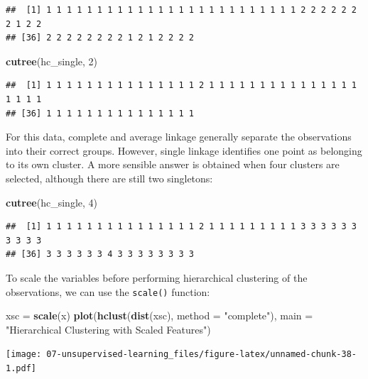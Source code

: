 \documentclass[openany]{book}
\newenvironment{Shaded}{\begin{snugshade}}{\end{snugshade}}
\newcommand{\DataTypeTok}[1]{\textcolor[rgb]{0.13,0.29,0.53}{#1}}
\newcommand{\DecValTok}[1]{\textcolor[rgb]{0.00,0.00,0.81}{#1}}
\newcommand{\KeywordTok}[1]{\textcolor[rgb]{0.13,0.29,0.53}{\textbf{#1}}}
\newcommand{\NormalTok}[1]{#1}
\newcommand{\StringTok}[1]{\textcolor[rgb]{0.31,0.60,0.02}{#1}}
\begin{document}
\begin{verbatim}
##  [1] 1 1 1 1 1 1 1 1 1 1 1 1 1 1 1 1 1 1 1 1 1 1 1 1 1 2 2 2 2 2 2 2 1 2 2
## [36] 2 2 2 2 2 2 2 2 1 2 1 2 2 2 2
\end{verbatim}

\begin{Shaded}
\begin{Highlighting}[]
\KeywordTok{cutree}\NormalTok{(hc_single, }\DecValTok{2}\NormalTok{)}
\end{Highlighting}
\end{Shaded}

\begin{verbatim}
##  [1] 1 1 1 1 1 1 1 1 1 1 1 1 1 1 1 2 1 1 1 1 1 1 1 1 1 1 1 1 1 1 1 1 1 1 1
## [36] 1 1 1 1 1 1 1 1 1 1 1 1 1 1 1
\end{verbatim}

For this data, complete and average linkage generally separate the observations
into their correct groups. However, single linkage identifies one point
as belonging to its own cluster. A more sensible answer is obtained when
four clusters are selected, although there are still two singletons:

\begin{Shaded}
\begin{Highlighting}[]
\KeywordTok{cutree}\NormalTok{(hc_single, }\DecValTok{4}\NormalTok{)}
\end{Highlighting}
\end{Shaded}

\begin{verbatim}
##  [1] 1 1 1 1 1 1 1 1 1 1 1 1 1 1 1 2 1 1 1 1 1 1 1 1 1 3 3 3 3 3 3 3 3 3 3
## [36] 3 3 3 3 3 3 4 3 3 3 3 3 3 3 3
\end{verbatim}

To scale the variables before performing hierarchical clustering of the
observations, we can use the \texttt{scale()} function:

\begin{Shaded}
\begin{Highlighting}[]
\NormalTok{xsc =}\StringTok{ }\KeywordTok{scale}\NormalTok{(x)}
\KeywordTok{plot}\NormalTok{(}\KeywordTok{hclust}\NormalTok{(}\KeywordTok{dist}\NormalTok{(xsc), }\DataTypeTok{method =} \StringTok{"complete"}\NormalTok{), }\DataTypeTok{main =} \StringTok{"Hierarchical Clustering with Scaled Features"}\NormalTok{)}
\end{Highlighting}
\end{Shaded}

\texttt{[image: 07-unsupervised-learning\_files/figure-latex/unnamed-chunk-38-1.pdf]}
\end{document}
